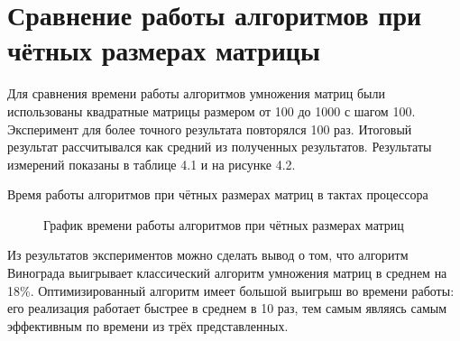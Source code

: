 \documentclass[12pt, a4paper]{report}
\begin{document}
	\section{Сравнение работы алгоритмов при чётных размерах матрицы}
	Для сравнения времени работы алгоритмов умножения матриц были использованы квадратные матрицы размером от 100 до 1000 с шагом 100. Эксперимент для более точного результата повторялся 100 раз. Итоговый результат рассчитывался как средний из полученных результатов. Результаты измерений показаны в таблице 4.1 и на рисунке 4.2.\\
	\begin{table}[ht!]
		\caption{Время работы алгоритмов при чётных размерах матриц в тактах процессора}
		\begin{center}
		\end{center}
	\end{table}
	
	\begin{figure}[ht!]
		\caption{График времени работы алгоритмов при чётных размерах матриц}
	\end{figure}
	
	Из результатов экспериментов можно сделать вывод о том, что алгоритм Винограда выигрывает классический алгоритм умножения матриц в среднем на 18\%. Оптимизированный алгоритм имеет большой выигрыш во времени работы: его реализация работает быстрее в среднем в 10 раз, тем самым являясь самым эффективным по времени из трёх представленных.
	
\end{document}
